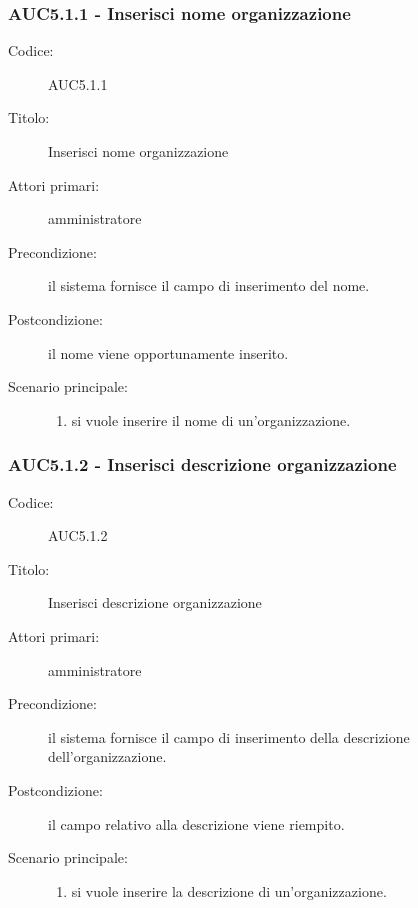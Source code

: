 \documentclass[../analisi-dei-requisiti.tex]{subfiles}
\begin{document}
  \subsubsection{AUC5.1.1 - Inserisci nome organizzazione}%
  \label{subsub:AUC5.1.1}
  \begin{description}
    \item[Codice:] AUC5.1.1
    \item[Titolo:] Inserisci nome organizzazione
    \item[Attori primari:] amministratore
    \item[Precondizione:] il sistema fornisce il campo di inserimento del nome.
    \item[Postcondizione:] il nome viene opportunamente inserito.
    \item[Scenario principale:]
    \begin{enumerate}
      \item si vuole inserire il nome di un'organizzazione.
    \end{enumerate}

  \end{description}

  \subsubsection{AUC5.1.2 - Inserisci descrizione organizzazione}%
  \label{subsub:AUC5.1.2}
  \begin{description}
    \item[Codice:] AUC5.1.2
    \item[Titolo:] Inserisci descrizione organizzazione
    \item[Attori primari:] amministratore
    \item[Precondizione:] il sistema fornisce il campo di inserimento della descrizione dell'organizzazione.
    \item[Postcondizione:] il campo relativo alla descrizione viene riempito.
    \item[Scenario principale:]
    \begin{enumerate}
      \item si vuole inserire la descrizione di un'organizzazione.
    \end{enumerate}
  \end{description}
\end{document}
